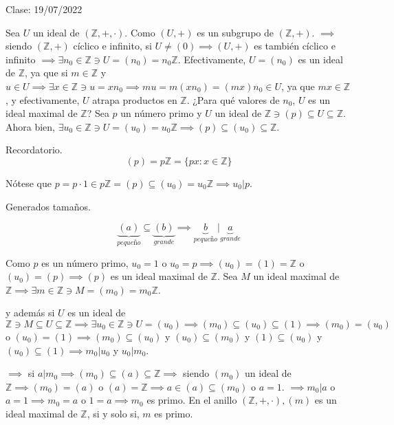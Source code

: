 

Clase: 19/07/2022


\begin{ejemplo}
    Sea $U$ un ideal de $(\mathbb{Z},+,\cdot)$. Como $(U,+)$ es un subgrupo de $(\mathbb{Z},+)$. $\implies$ siendo $(\mathbb{Z},+)$ cíclico e infinito, si $U\neq (0)\implies (U,+)$ es también cíclico e infinito $\implies \exists n_0\in\mathbb{Z}\ni U=(n_0)=n_0\mathbb{Z}$. Efectivamente, $U=(n_0)$ es un ideal de $\mathbb{Z}$, ya que si $m\in\mathbb{Z}$ y $u\in U\implies \exists x\in\mathbb{Z}\ni u = xn_0\implies mu=m(xn_0)=(mx)n_0\in U$, ya que $mx\in \mathbb{Z}$, y efectivamente, $U$ atrapa productos en $\mathbb{Z}$. ¿Para qué valores de $n_0$, $U$ es un ideal maximal de $\mathbb{Z}$? Sea $p$ un número primo y $U$ un ideal de $\mathbb{Z}\ni (p)\subseteq U\subseteq \mathbb{Z}$. Ahora bien, $\exists u_0\in\mathbb{Z}\ni U =(u_0)=u_0\mathbb{Z}\implies (p)\subseteq (u_0)\subseteq \mathbb{Z}$. 
    \begin{cajita}
        Recordatorio. 
        $$(p)=p\mathbb{Z}=\{px:x\in\mathbb{Z}\}$$
    \end{cajita}
    Nótese que $p=p\cdot 1\in p\mathbb{Z}=(p)\subseteq (u_0)=u_0\mathbb{Z}\implies u_0|p$.

    \begin{cajita}
        Generados tamaños. 

        $$\underbrace{(a)}_{pequeño}\subseteq \underbrace{(b)}_{grande}\implies \underbrace{b}_{pequeño}|\underbrace{a}_{grande}$$
    \end{cajita}

    Como $p$ es un número primo, $u_0=1$ o $u_0=p\implies (u_0)=(1)=\mathbb{Z}$ o $(u_0)=(p)\implies (p)$ es un ideal maximal de $\mathbb{Z}$. Sea $M$ un ideal maximal de $\mathbb{Z}\implies \exists m\in\mathbb{Z}\ni M=(m_0)=m_0\mathbb{Z}$. 
    \begin{cajita}
        y además si $U$ es un ideal de $\mathbb{Z}\ni M\subseteq U\subseteq \mathbb{Z}\implies \exists u_0\in\mathbb{Z}\ni U=(u_0)\implies (m_0)\subseteq (u_0)\subseteq (1)\implies (m_0)=(u_0)$ o $(u_0)=(1)\implies (m_0)\subseteq (u_0)$ y $(u_0)\subseteq (m_0)$ y $(1)\subseteq (u_0)$ y $(u_0)\subseteq (1)\implies m_0|u_0$ y $u_0|m_0$. 
    \end{cajita}
    $\implies$ si $a|m_0\implies (m_0)\subseteq (a)\subseteq \mathbb{Z}\implies $ siendo $(m_0)$ un ideal de $\mathbb{Z}\implies (m_0)=(a)$ o $(a)=\mathbb{Z}\implies a\in (a)\subseteq (m_0)$ o $a=1$. $\implies m_0|a$ o $a=1\implies m_0=a$ o $1=a\implies m_0$ es primo. En el anillo $(\mathbb{Z},+,\cdot), (m)$ es un ideal maximal de $\mathbb{Z}$, si y solo si, $m$ es primo. 
    

\end{ejemplo}

